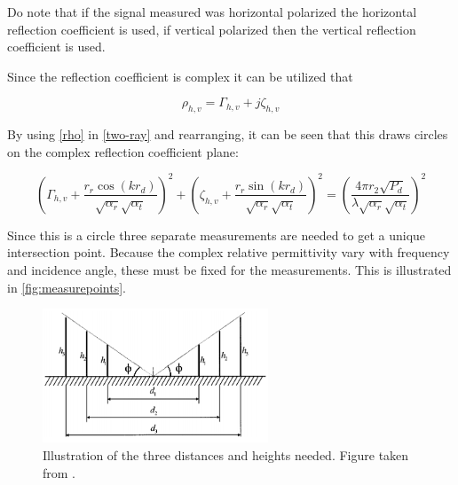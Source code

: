Do note that if the signal measured was horizontal polarized the horizontal reflection coefficient is used, if vertical polarized then the vertical reflection coefficient is used.

Since the reflection coefficient is complex it can be utilized that

\begin{equation}\label{rho}
\rho_{h,v} = \Gamma_{h,v}+j\zeta_{h,v}
\end{equation}
\begin{where}
\end{where}

By using \autoref{rho} in \autoref{two-ray} and rearranging, it can be seen that this draws circles on the complex reflection coefficient plane:

\begin{equation}\label{two-ray-circle}
\left(\Gamma_{h,v}+\frac{r_r\cos(kr_d)}{\sqrt{\alpha_r}\sqrt{\alpha_t}}\right)^2+\left(\zeta_{h,v}+\frac{r_r\sin(kr_d)}{\sqrt{\alpha_r}\sqrt{\alpha_t}}\right)^2=\left(\frac{4\pi r_2 \sqrt{P_d}}{\lambda\sqrt{\alpha_r}\sqrt{\alpha_t}}\right)^2
\end{equation}
\begin{where}
\end{where}


Since this is a circle three separate measurements are needed to get a unique intersection point. Because the complex relative permittivity vary with frequency and incidence angle, these must be fixed for the measurements. This is illustrated in \autoref{fig:measurepoints}.

\begin{figure}[H]
\centering
\includegraphics[width=0.6\textwidth]{figure/measurepoints.png}
\caption{Illustration of the three distances and heights needed. Figure taken from \citep{Kim}.}
\label{fig:measurepoints}
\end{figure}

